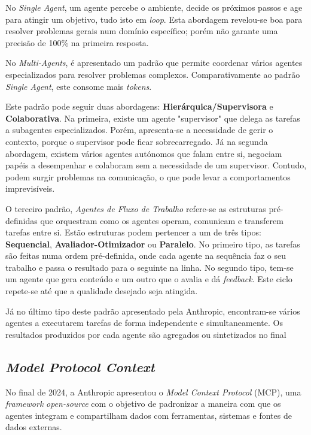 No \textit{Single Agent}, um agente percebe o ambiente, decide os próximos passos e age para atingir um objetivo, tudo isto em \textit{loop}. Esta abordagem revelou-se boa para resolver problemas gerais num domínio específico; porém não garante uma precisão de 100\% na primeira resposta.

No \textit{Multi-Agents}, é apresentado um padrão que permite coordenar vários agentes especializados para resolver problemas complexos. Comparativamente ao padrão \textit{Single Agent}, este consome mais \textit{tokens}.

Este padrão pode seguir duas abordagens: \textbf{Hierárquica/Supervisora} e \textbf{Colaborativa}. Na primeira, existe um agente "supervisor" que delega as tarefas a subagentes especializados. Porém, apresenta-se a necessidade de gerir o contexto, porque o supervisor pode ficar sobrecarregado. Já na segunda abordagem, existem vários agentes autónomos que falam entre si, negociam papéis a desempenhar e colaboram sem a necessidade de um supervisor. Contudo, podem surgir problemas na comunicação, o que pode levar a comportamentos imprevisíveis.

O terceiro padrão, \textit{Agentes de Fluxo de Trabalho} refere-se as estruturas pré-definidas que orquestram como os agentes operam, comunicam e transferem tarefas entre si. Estão estruturas podem pertencer a um de três tipos: \textbf{Sequencial}, \textbf{Avaliador-Otimizador} ou \textbf{Paralelo}. No primeiro tipo, as tarefas são feitas numa ordem pré-definida, onde cada agente na sequência faz o seu trabalho e passa o resultado para o seguinte na linha. No segundo tipo, tem-se um agente que gera conteúdo e um outro que o avalia e dá \textit{feedback}. Este ciclo repete-se até que a qualidade desejado seja atingida.

Já no último tipo deste padrão apresentado pela Anthropic, encontram-se vários agentes a executarem tarefas de forma independente e simultaneamente. Os resultados produzidos por cada agente são agregados ou sintetizados no final


\subsection{\textit{Model Protocol Context}}
\label{sec:mcp_arc}

No final de 2024, a Anthropic apresentou o \textit{Model Context Protocol} (MCP), uma \textit{framework} \textit{open-source} com o objetivo de padronizar a maneira com que os agentes integram e compartilham dados com ferramentas, sistemas e fontes de dados externas.


